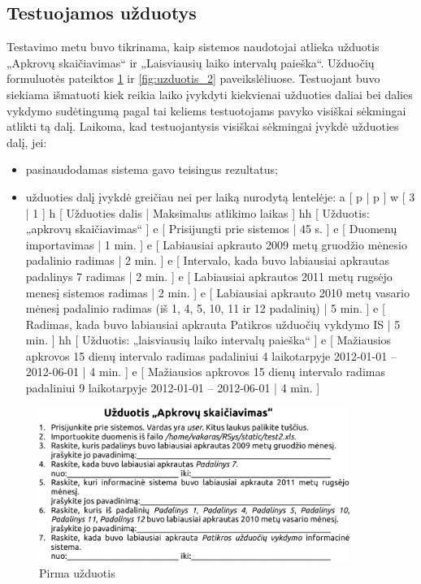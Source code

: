 \subsection{Testuojamos užduotys}

Testavimo metu buvo tikrinama, kaip sistemos naudotojai atlieka
užduotis „Apkrovų skaičiavimas“ ir „Laisviausių laiko
intervalų paieška“. Užduočių formuluotės pateiktos
\ref{fig:uzduotis_1} ir \ref{fig:uzduotis_2} paveikslėliuose.
Testuojant buvo siekiama išmatuoti kiek reikia laiko įvykdyti
kiekvienai užduoties daliai bei dalies vykdymo sudėtingumą pagal tai
keliems testuotojams pavyko visiškai sėkmingai atlikti tą dalį.
Laikoma, kad testuojantysis visiškai sėkmingai įvykdė užduoties dalį,
jei:
\begin{itemize}
  \item pasinaudodamas sistema gavo teisingus rezultatus;
  \item užduoties dalį įvykdė greičiau nei per laiką nurodytą lentelėje:
\xtableu
{
  a [ p | p ]
  w [ 3 | 1 ]
  h [ Užduoties dalis | Maksimalus atlikimo laikas ]
  hh [ Užduotis: „apkrovų skaičiavimas“ ]
  e [ Prisijungti prie sistemos | 45 s. ]
  e [ Duomenų importavimas | 1 min. ]
  e [ Labiausiai apkrauto 2009 metų gruodžio mėnesio padalinio radimas 
      | 2 min. ]
  e [ Intervalo, kada buvo labiausiai apkrautas padalinys 7 radimas 
      | 2 min. ]
  e [ Labiausiai apkrautos 2011 metų rugsėjo menesį sistemos radimas 
      | 2 min. ]
  e [ Labiausiai apkrauto 2010 metų vasario mėnesį padalinio radimas
      (iš 1, 4, 5, 10, 11 ir 12 padalinių) 
      | 5 min. ]
  e [ Radimas, kada buvo labiausiai apkrauta Patikros užduočių vykdymo IS 
      | 5 min. ]
  hh [ Užduotis: „laisviausių laiko intervalų paieška“ ]
  e [ Mažiausios apkrovos 15 dienų intervalo radimas padaliniui 
      4 laikotarpyje 2012-01-01 – 2012-06-01 | 4 min. ]
  e [ Mažiausios apkrovos 15 dienų intervalo radimas padaliniui 
      9 laikotarpyje 2012-01-01 – 2012-06-01 | 4 min. ]
}
\end{itemize}

\begin{figure}[H]
  \begin{center}
    \includegraphics[width=0.9\textwidth]{./4/pdfs/uzduotis1.pdf}
  \end{center}
  \caption{Pirma užduotis}
  \label{fig:uzduotis_1}
\end{figure}

